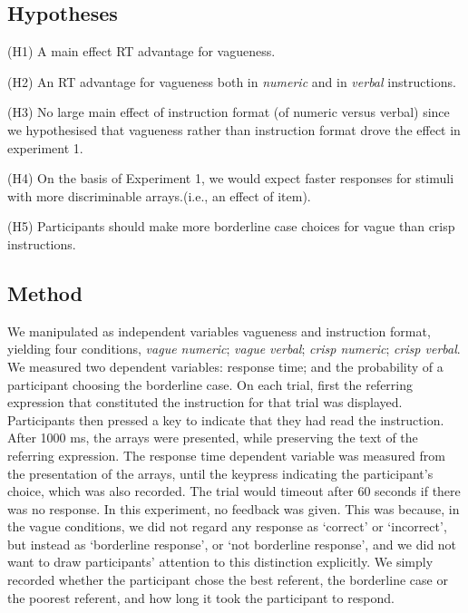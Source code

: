 \documentclass[%
man,		%
floatsintext,%
apacite%
]{apa6}
\begin{document}
\subsection{Hypotheses} %
\begin{APAenumerate}
	\item [(H1)] A main effect RT advantage for vagueness.
	\item [(H2)] An RT advantage for vagueness both in \emph{numeric} and in \emph{verbal} instructions.
	\item [(H3)] No large main effect of instruction format (of numeric versus verbal) since we hypothesised that vagueness rather than instruction format drove the effect in experiment 1.
	\item [(H4)] On the basis of Experiment 1, we would expect faster responses for stimuli with more discriminable arrays.(i.e., an effect of item).
	\item [(H5)] Participants should make more borderline case choices for vague than crisp instructions.
\end{APAenumerate}

\subsection{Method} %
We manipulated as independent variables vagueness and instruction format, yielding four conditions, \emph{vague numeric}; \emph{vague verbal}; \emph{crisp numeric}; \emph{crisp verbal}.
We measured two dependent variables: response time; and the probability of a participant choosing the borderline case.
On each trial, first the referring expression that constituted the instruction for that trial was displayed. 
Participants then pressed a key to indicate that they had read the instruction. 
After 1000 ms, the arrays were presented, while preserving the text of the referring expression. 
The response time dependent variable was measured from the presentation of the arrays, until the keypress indicating the participant's choice, which was also recorded. 
The trial would timeout after 60 seconds if there was no response.
In this experiment, no feedback was given. 
This was because, in the vague conditions, we did not regard any response as `correct' or `incorrect', but instead as `borderline response', or `not borderline response', and we did not want to draw participants' attention to this distinction explicitly. 
We simply recorded whether the participant chose the best referent, the borderline case or the poorest referent, and how long it took the participant to respond.
\end{document}
